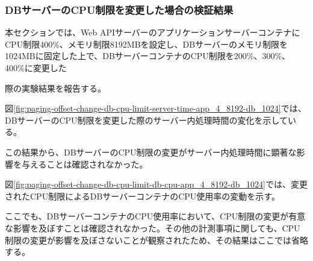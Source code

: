 \documentclass[../../../../main]{subfiles}
\begin{document}
    \subsubsection{DBサーバーのCPU制限を変更した場合の検証結果}\label{subsubsec:result-paging-offset-change-db-cpu}

    本セクションでは、Web APIサーバーのアプリケーションサーバーコンテナにCPU制限400\%、メモリ制限8192MBを設定し、DBサーバーのメモリ制限を1024MBに固定した上で、DBサーバーコンテナのCPU制限を200\%、300\%、400\%に変更した

    際の実験結果を報告する。


    図\ref{fig:paging-offset-change-db-cpu-limit-server-time-app_4_8192-db_1024}では、DBサーバーのCPU制限を変更した際のサーバー内処理時間の変化を示している。

    

    この結果から、DBサーバーのCPU制限の変更がサーバー内処理時間に顕著な影響を与えることは確認されなかった。


    図\ref{fig:paging-offset-change-db-cpu-limit-db-cpu-app_4_8192-db_1024}では、変更されたCPU制限によるDBサーバーコンテナのCPU使用率の変動を示す。

    

    ここでも、DBサーバーコンテナのCPU使用率において、CPU制限の変更が有意な影響を及ぼすことは確認されなかった。その他の計測事項に関しても、CPU制限の変更が影響を及ぼさないことが観察されたため、その結果はここでは省略する。
\end{document}
